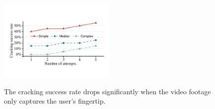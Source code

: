     \begin{figure}[!t]
        \centering
        \includegraphics[width=0.5\textwidth]{fig/finger-only}\\
        \caption{The cracking success rate drops significantly when the video footage only captures the user's fingertip.}
        \label{fig:finger-only}
    \end{figure}

